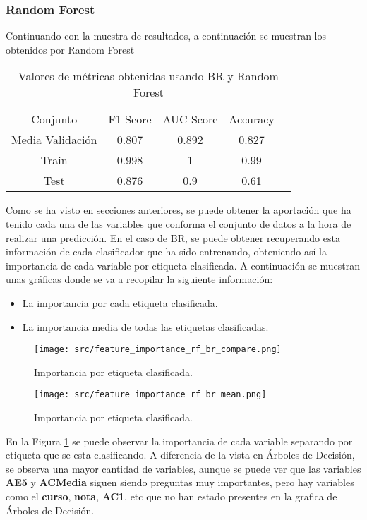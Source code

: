 \subsubsection*{Random Forest}
Continuando con la muestra de resultados, a continuación se muestran los obtenidos por Random Forest
\begin{table}[H]
	\centering
	\begin{tabular}{|c|c|c|c|c}
		\cline{1-4}
		Conjunto         & F1 Score & AUC Score & Accuracy \\ \cline{1-4}
		Media Validación & 0.807    & 0.892     & 0.827    \\ \cline{1-4}
		Train            & 0.998    & 1         & 0.99     \\ \cline{1-4}
		Test             & 0.876    & 0.9       & 0.61     \\ \cline{1-4}
	\end{tabular}
	\caption{Valores de métricas obtenidas usando BR y Random Forest}
\end{table}
Como se ha visto en secciones anteriores, se puede obtener la aportación que ha tenido cada una de las variables que conforma el conjunto de datos a la hora de realizar una predicción. En el caso de BR, se puede obtener recuperando esta información de cada clasificador que ha sido entrenando, obteniendo así la importancia de cada variable por etiqueta clasificada.
A continuación se muestran unas gráficas donde se va a recopilar la siguiente información: \linebreak
\begin{itemize}
	\item La importancia por cada etiqueta clasificada.
	\item La importancia media de todas las etiquetas clasificadas.
\end{itemize}
\begin{figure}[H]
	\centering
	\texttt{[image: src/feature\_importance\_rf\_br\_compare.png]}
	\caption{Importancia por etiqueta clasificada.}
	\label{fig:rf_br_label}
\end{figure}
\begin{figure}[H]
	\centering
	\texttt{[image: src/feature\_importance\_rf\_br\_mean.png]}
	\caption{Importancia por etiqueta clasificada.}
	\label{fig:rf_br_mean}
\end{figure}
En la Figura \ref{fig:rf_br_label} se puede observar la importancia de cada variable separando por etiqueta que se esta clasificando. A diferencia de la vista en Árboles de Decisión, se observa una mayor cantidad de variables, aunque se puede ver que las variables \textbf{AE5} y \textbf{ACMedia} siguen siendo preguntas muy importantes, pero hay variables como el \textbf{curso}, \textbf{nota}, \textbf{AC1}, etc que no han estado presentes en la grafica de Árboles de Decisión.\\
